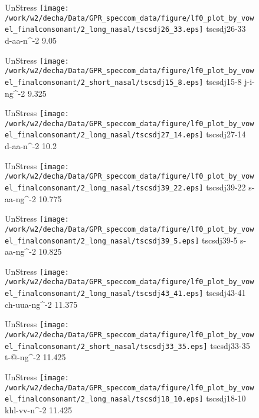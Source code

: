\documentclass{article}
\begin{document}
\begin{figure}[t]
\begin{minipage}[b]{.24\textwidth}
UnStress
\centering
\texttt{[image: /work/w2/decha/Data/GPR\_speccom\_data/figure/lf0\_plot\_by\_vowel\_finalconsonant/2\_long\_nasal/tscsdj26\_33.eps]}
tscsdj26-33 d-aa-n\textasciicircum-2 9.05
\end{minipage}
\begin{minipage}[b]{.24\textwidth}
UnStress
\centering
\texttt{[image: /work/w2/decha/Data/GPR\_speccom\_data/figure/lf0\_plot\_by\_vowel\_finalconsonant/2\_short\_nasal/tscsdj15\_8.eps]}
tscsdj15-8 j-i-ng\textasciicircum-2 9.325
\end{minipage}
\begin{minipage}[b]{.24\textwidth}
UnStress
\centering
\texttt{[image: /work/w2/decha/Data/GPR\_speccom\_data/figure/lf0\_plot\_by\_vowel\_finalconsonant/2\_long\_nasal/tscsdj27\_14.eps]}
tscsdj27-14 d-aa-n\textasciicircum-2 10.2
\end{minipage}
\begin{minipage}[b]{.24\textwidth}
UnStress
\centering
\texttt{[image: /work/w2/decha/Data/GPR\_speccom\_data/figure/lf0\_plot\_by\_vowel\_finalconsonant/2\_long\_nasal/tscsdj39\_22.eps]}
tscsdj39-22 s-aa-ng\textasciicircum-2 10.775
\end{minipage}
\end{figure}

\begin{figure}[t]
\begin{minipage}[b]{.24\textwidth}
UnStress
\centering
\texttt{[image: /work/w2/decha/Data/GPR\_speccom\_data/figure/lf0\_plot\_by\_vowel\_finalconsonant/2\_long\_nasal/tscsdj39\_5.eps]}
tscsdj39-5 s-aa-ng\textasciicircum-2 10.825
\end{minipage}
\begin{minipage}[b]{.24\textwidth}
UnStress
\centering
\texttt{[image: /work/w2/decha/Data/GPR\_speccom\_data/figure/lf0\_plot\_by\_vowel\_finalconsonant/2\_long\_nasal/tscsdj43\_41.eps]}
tscsdj43-41 ch-uua-ng\textasciicircum-2 11.375
\end{minipage}
\begin{minipage}[b]{.24\textwidth}
UnStress
\centering
\texttt{[image: /work/w2/decha/Data/GPR\_speccom\_data/figure/lf0\_plot\_by\_vowel\_finalconsonant/2\_short\_nasal/tscsdj33\_35.eps]}
tscsdj33-35 t-@-ng\textasciicircum-2 11.425
\end{minipage}
\begin{minipage}[b]{.24\textwidth}
UnStress
\centering
\texttt{[image: /work/w2/decha/Data/GPR\_speccom\_data/figure/lf0\_plot\_by\_vowel\_finalconsonant/2\_long\_nasal/tscsdj18\_10.eps]}
tscsdj18-10 khl-vv-n\textasciicircum-2 11.425
\end{minipage}
\end{figure}
\end{document}
